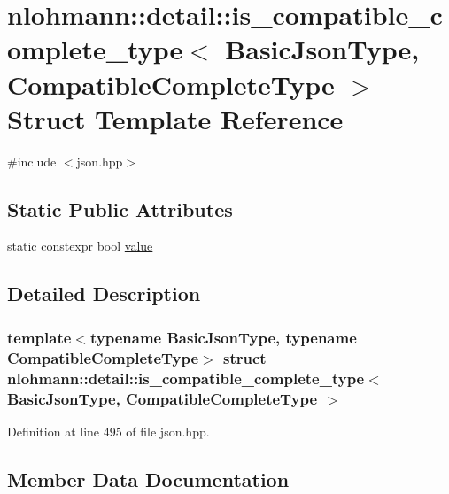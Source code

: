 \hypertarget{structnlohmann_1_1detail_1_1is__compatible__complete__type}{}\section{nlohmann\+:\+:detail\+:\+:is\+\_\+compatible\+\_\+complete\+\_\+type$<$ Basic\+Json\+Type, Compatible\+Complete\+Type $>$ Struct Template Reference}
\label{structnlohmann_1_1detail_1_1is__compatible__complete__type}


{\ttfamily \#include $<$json.\+hpp$>$}

\subsection*{Static Public Attributes}
\begin{DoxyCompactItemize}
\item 
static constexpr bool \hyperlink{structnlohmann_1_1detail_1_1is__compatible__complete__type_a34bed4700a302b79feb045b6bdbda9aa}{value}
\end{DoxyCompactItemize}


\subsection{Detailed Description}
\subsubsection*{template$<$typename Basic\+Json\+Type, typename Compatible\+Complete\+Type$>$\newline
struct nlohmann\+::detail\+::is\+\_\+compatible\+\_\+complete\+\_\+type$<$ Basic\+Json\+Type, Compatible\+Complete\+Type $>$}



Definition at line 495 of file json.\+hpp.



\subsection{Member Data Documentation}
\mbox{\label{structnlohmann_1_1detail_1_1is__compatible__complete__type_a34bed4700a302b79feb045b6bdbda9aa}} 
